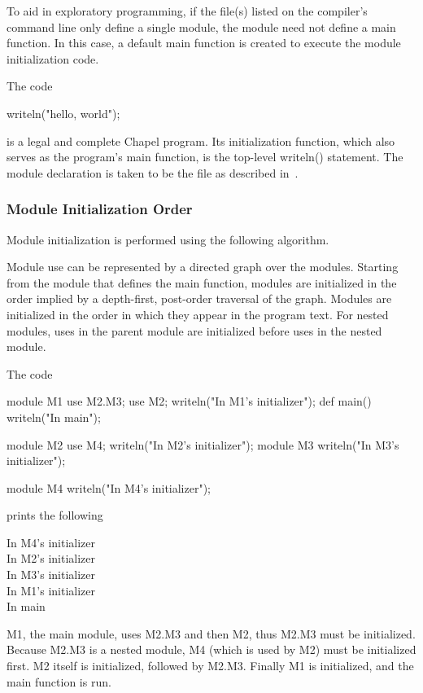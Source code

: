 

To aid in exploratory programming, if the file(s) listed on the
compiler's command line only define a single module, the module need
not define a main function.  In this case, a default main function is
created to execute the module initialization code.
\begin{example}
The code
\begin{chapel}
writeln("hello, world");
\end{chapel}
is a legal and complete Chapel program.  Its initialization function,
which also serves as the program's main function, is the top-level
writeln() statement.  The module declaration is taken to be the file
as described in~.
\end{example}


\subsubsection{Module Initialization Order}
\label{Module_Initialization_Order}

Module initialization is performed using the following algorithm.

Module use can be represented by a directed graph over the modules.
Starting from the module that defines the main function, modules are
initialized in the order implied by a depth-first, post-order
traversal of the graph.  Modules are initialized in the order in which
they appear in the program text.  For nested modules, uses in the
parent module are initialized before uses in the nested module.

\begin{example}
The code
\begin{chapelpre}
\end{chapelpre}
\begin{chapel}
module M1 {
  use M2.M3;
  use M2;
  writeln("In M1's initializer");
  def main() {
    writeln("In main");
  }
}

module M2 {
  use M4;
  writeln("In M2's initializer");
  module M3 {
    writeln("In M3's initializer");
  }
}

module M4 {
  writeln("In M4's initializer");
}
\end{chapel}
prints the following
\begin{printchapeloutput}
In M4's initializer\\
In M2's initializer\\
In M3's initializer\\
In M1's initializer\\
In main
\end{printchapeloutput}
M1, the main module, uses M2.M3 and then M2, thus M2.M3 must be
initialized.  Because M2.M3 is a nested module, M4 (which is used by
M2) must be initialized first.  M2 itself is initialized, followed by
M2.M3.  Finally M1 is initialized, and the main function is run.
\end{example}

